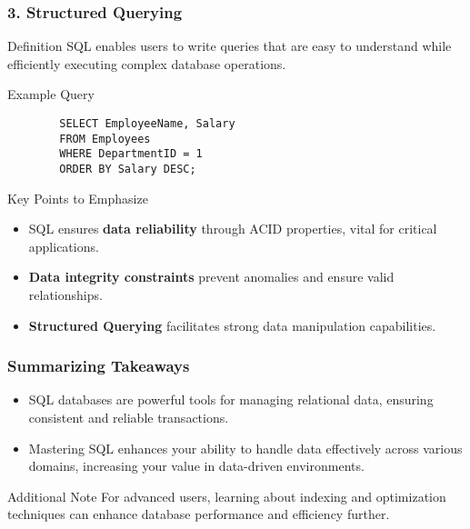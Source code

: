 \documentclass[aspectratio=169]{beamer}
\begin{document}
\begin{frame}[fragile]
    \frametitle{3. Structured Querying}
    \begin{block}{Definition}
        SQL enables users to write queries that are easy to understand while efficiently executing complex database operations.
    \end{block}
    
    \begin{block}{Example Query}
        \begin{lstlisting}
        SELECT EmployeeName, Salary
        FROM Employees
        WHERE DepartmentID = 1
        ORDER BY Salary DESC;
        \end{lstlisting}
    \end{block}
    
    \begin{block}{Key Points to Emphasize}
        \begin{itemize}
            \item SQL ensures \textbf{data reliability} through ACID properties, vital for critical applications.
            \item \textbf{Data integrity constraints} prevent anomalies and ensure valid relationships.
            \item \textbf{Structured Querying} facilitates strong data manipulation capabilities.
        \end{itemize}
    \end{block}
\end{frame}

\begin{frame}[fragile]
    \frametitle{Summarizing Takeaways}
    \begin{itemize}
        \item SQL databases are powerful tools for managing relational data, ensuring consistent and reliable transactions.
        \item Mastering SQL enhances your ability to handle data effectively across various domains, increasing your value in data-driven environments.
    \end{itemize}
    
    \begin{block}{Additional Note}
        For advanced users, learning about indexing and optimization techniques can enhance database performance and efficiency further.
    \end{block}
\end{frame}
\end{document}
